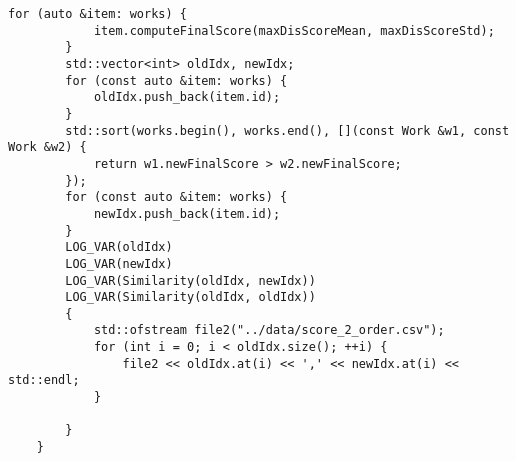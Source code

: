 \documentclass[bwprint]{gmcmthesis}
\begin{document}
\begin{lstlisting}[label=问题2,caption={问题2代码}]
        for (auto &item: works) {
            item.computeFinalScore(maxDisScoreMean, maxDisScoreStd);
        }
        std::vector<int> oldIdx, newIdx;
        for (const auto &item: works) {
            oldIdx.push_back(item.id);
        }
        std::sort(works.begin(), works.end(), [](const Work &w1, const Work &w2) {
            return w1.newFinalScore > w2.newFinalScore;
        });
        for (const auto &item: works) {
            newIdx.push_back(item.id);
        }
        LOG_VAR(oldIdx)
        LOG_VAR(newIdx)
        LOG_VAR(Similarity(oldIdx, newIdx))
        LOG_VAR(Similarity(oldIdx, oldIdx))
        {
            std::ofstream file2("../data/score_2_order.csv");
            for (int i = 0; i < oldIdx.size(); ++i) {
                file2 << oldIdx.at(i) << ',' << newIdx.at(i) << std::endl;
            }

        }
    }
\end{lstlisting}
\end{document}
